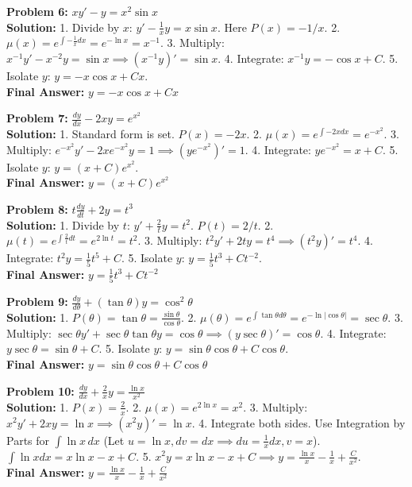 \documentclass[11pt]{article}
\begin{document}
\vspace{10pt}
\textbf{Problem 6:} $x y' - y = x^2 \sin x$ \\
\textbf{Solution:} 
1. Divide by $x$: $y' - \frac{1}{x}y = x \sin x$. Here $P(x) = -1/x$. 
2. $\mu(x) = e^{\int -\frac{1}{x} dx} = e^{-\ln x} = x^{-1}$. 
3. Multiply: $x^{-1}y' - x^{-2}y = \sin x \implies (x^{-1}y)' = \sin x$. 
4. Integrate: $x^{-1}y = -\cos x + C$.
5. Isolate $y$: $y = -x\cos x + Cx$. \\
\textbf{Final Answer:} $y = -x\cos x + Cx$

\vspace{10pt}
\textbf{Problem 7:} $\frac{dy}{dx} - 2xy = e^{x^2}$ \\
\textbf{Solution:} 
1. Standard form is set. $P(x) = -2x$. 
2. $\mu(x) = e^{\int -2x dx} = e^{-x^2}$. 
3. Multiply: $e^{-x^2}y' - 2xe^{-x^2}y = 1 \implies (ye^{-x^2})' = 1$. 
4. Integrate: $ye^{-x^2} = x + C$. 
5. Isolate $y$: $y = (x+C)e^{x^2}$. \\
\textbf{Final Answer:} $y = (x+C)e^{x^2}$

\vspace{10pt}
\textbf{Problem 8:} $t \frac{dy}{dt} + 2y = t^3$ \\
\textbf{Solution:} 
1. Divide by $t$: $y' + \frac{2}{t}y = t^2$. $P(t) = 2/t$. 
2. $\mu(t) = e^{\int \frac{2}{t} dt} = e^{2\ln t} = t^2$. 
3. Multiply: $t^2y' + 2ty = t^4 \implies (t^2 y)' = t^4$. 
4. Integrate: $t^2 y = \frac{1}{5}t^5 + C$. 
5. Isolate $y$: $y = \frac{1}{5}t^3 + Ct^{-2}$. \\
\textbf{Final Answer:} $y = \frac{1}{5}t^3 + Ct^{-2}$

\vspace{10pt}
\textbf{Problem 9:} $\frac{dy}{d\theta} + (\tan \theta)y = \cos^2 \theta$ \\
\textbf{Solution:} 
1. $P(\theta) = \tan \theta = \frac{\sin \theta}{\cos \theta}$. 
2. $\mu(\theta) = e^{\int \tan \theta d\theta} = e^{-\ln|\cos \theta|} = \sec \theta$. 
3. Multiply: $\sec \theta y' + \sec \theta \tan \theta y = \cos \theta \implies (y \sec \theta)' = \cos \theta$. 
4. Integrate: $y \sec \theta = \sin \theta + C$. 
5. Isolate $y$: $y = \sin \theta \cos \theta + C\cos \theta$. \\
\textbf{Final Answer:} $y = \sin \theta \cos \theta + C\cos \theta$

\vspace{10pt}
\textbf{Problem 10:} $\frac{dy}{dx} + \frac{2}{x}y = \frac{\ln x}{x^2}$ \\
\textbf{Solution:} 
1. $P(x) = \frac{2}{x}$. 
2. $\mu(x) = e^{2\ln x} = x^2$. 
3. Multiply: $x^2 y' + 2x y = \ln x \implies (x^2 y)' = \ln x$. 
4. Integrate both sides. Use Integration by Parts for $\int \ln x \, dx$ (Let $u=\ln x, dv=dx \implies du=\frac{1}{x}dx, v=x$). $\int \ln x dx = x\ln x - x + C$. 
5. $x^2 y = x\ln x - x + C \implies y = \frac{\ln x}{x} - \frac{1}{x} + \frac{C}{x^2}$. \\
\textbf{Final Answer:} $y = \frac{\ln x}{x} - \frac{1}{x} + \frac{C}{x^2}$
\end{document}
